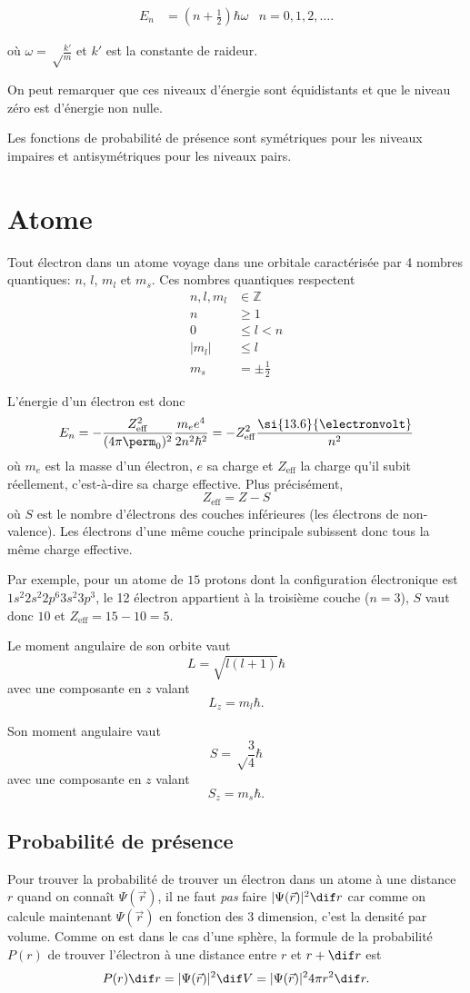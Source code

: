 \begin{align*}
  E_n & = \left(n+\frac{1}{2}\right)\hbar\omega & n = 0, 1, 2, \ldots.
\end{align*}

où $\omega = \sqrt\frac{k'}{m}$ et
$k'$ est la constante de raideur.

On peut remarquer que ces niveaux d'énergie sont équidistants et que
le niveau zéro est d'énergie non nulle.

Les fonctions de probabilité de présence sont symétriques pour les
niveaux impaires et antisymétriques pour les niveaux pairs.

\section{Atome}
Tout électron dans un atome voyage dans une orbitale caractérisée par
4 nombres quantiques: $n$, $l$, $m_l$ et $m_s$.
Ces nombres quantiques respectent
\begin{align*}
  n, l, m_l & \in \mathbb{Z}\\
  n & \geq 1\\
  0 & \leq l < n\\
  |m_l| & \leq l\\
  m_s & = \pm \frac12
\end{align*}

L'énergie d'un électron est donc
\[ E_n = -\frac{Z_\mathrm{eff}^2}{(4\pi\perm_0)^2}\frac{m_ee^4}{2n^2\hbar^2}
= -Z_\mathrm{eff}^2\frac{\si{13.6}{\electronvolt}}{n^2} \]
où $m_e$ est la masse d'un électron, $e$ sa charge et
$Z_\mathrm{eff}$ la charge qu'il subit réellement,
c'est-à-dire sa charge effective.
Plus précisément, 
\[ Z_\mathrm{eff} = Z - S \] 
où $S$ est le nombre d'électrons des couches inférieures (les électrons de non-valence).
Les électrons d'une même couche principale subissent donc tous la même charge effective.

Par exemple, pour un atome de $15$ protons dont la configuration 
électronique est $1s^2 2s^2 2p^6 3s^2 3p^3$, le 12\ieme{} électron
appartient à la troisième couche ($n=3$), $S$ vaut donc $10$ et 
$Z_\mathrm{eff} = 15 - 10 = 5$.

Le moment angulaire de son orbite vaut
\[ L = \sqrt{l(l+1)} \hbar \]
avec une composante en $z$ valant
\[ L_z = m_l \hbar. \]

Son moment angulaire vaut
\[ S = \sqrt\frac34 \hbar \]
avec une composante en $z$ valant
\[ S_z = m_s \hbar. \]

\subsection{Probabilité de présence}
Pour trouver la probabilité de trouver un électron dans un atome
à une distance $r$ quand on connaît $\Psi(\vec{r})$,
il ne faut \emph{pas} faire $|\Psi(\vec{r})|^2 \dif r$
car comme on calcule maintenant $\Psi(\vec{r})$ en fonction des 3 dimension,
c'est la densité par volume.
Comme on est dans le cas d'une sphère, la formule de la probabilité
$P(r)$ de trouver l'électron à une distance entre $r$ et $r+\dif r$ est
\[ P(r) \dif r = |\Psi(\vec{r})|^2 \dif V
= |\Psi(\vec{r})|^2 4\pi r^2 \dif r. \]

